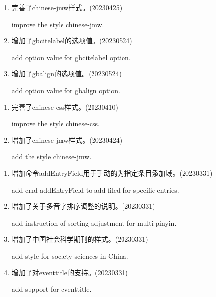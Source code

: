 \label{up:20230524}
\begin{enumerate}

\item 完善了chinese-jmw样式。(20230425)

improve the style chinese-jmw.

\item 增加了gbcitelabel的选项值。(20230524)

add option value for gbcitelabel option.


\item 增加了gbalign的选项值。(20230524)

add option value for gbalign option.

\end{enumerate}


\label{up:20230424}
\begin{enumerate}

\item 完善了chinese-css样式。(20230410)

improve the style chinese-css.

\item 增加了chinese-jmw样式。(20230424)

add the style chinese-jmw.

\end{enumerate}

\label{up:20230331}
\begin{enumerate}

\item 增加命令addEntryField用于手动的为指定条目添加域。(20230331)

add cmd addEntryField to add filed for specific entries.


\item 增加了关于多音字排序调整的说明。(20230331)

add instruction of sorting adjustment for multi-pinyin.


\item 增加了中国社会科学期刊的样式。(20230331)

add style for society sciences in China.

\item 增加了对eventtitle的支持。(20230331)

add support for eventtitle.

\end{enumerate}


